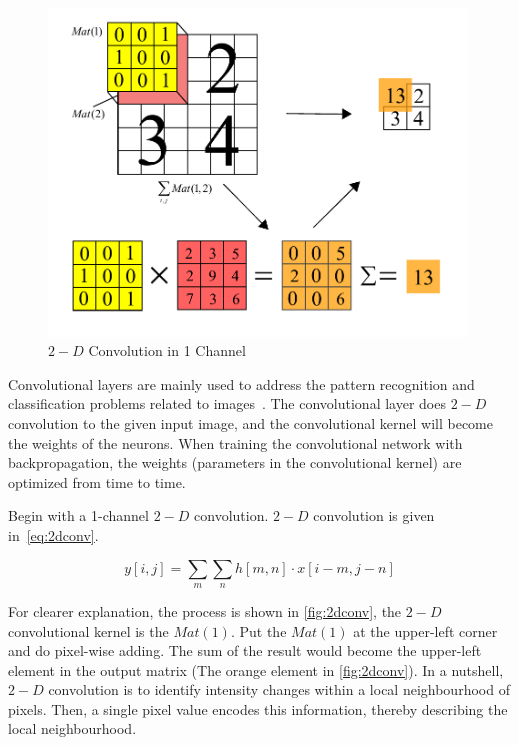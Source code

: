 \begin{spacing}{1.5}
\begin{figure}[ht]
\centering
\includegraphics[width=0.99\textwidth, fbox]{Chapter2/2dconv.pdf}
\caption{$2-D$ Convolution in 1 Channel}
\label{fig:2dconv} 
\end{figure}

Convolutional layers are mainly used to address the pattern recognition and classification problems related to images~\cite{o2015introduction}. The convolutional layer does $2-D$ convolution to the given input image, and the convolutional kernel will become the weights of the neurons. When training the convolutional network with backpropagation, the weights (parameters in the convolutional kernel) are optimized from time to time.

Begin with a 1-channel $2-D$ convolution. $2-D$ convolution is given in~\autoref{eq:2dconv}.

\begin{equation}
\label{eq:2dconv}
    y[i,j]= \sum_m \sum_n h[m,n] \cdot x[i-m,j-n]
\end{equation}

For clearer explanation, the process is shown in \autoref{fig:2dconv}, the $2-D$ convolutional kernel is the $Mat(1)$. Put the $Mat(1)$ at the upper-left corner and do pixel-wise adding. The sum of the result would become the upper-left element in the output matrix (The orange element in \autoref{fig:2dconv}). In a nutshell, $2-D$ convolution is to identify intensity changes within a local neighbourhood of pixels. Then, a single pixel value encodes this information, thereby describing the local neighbourhood.


\end{spacing}
